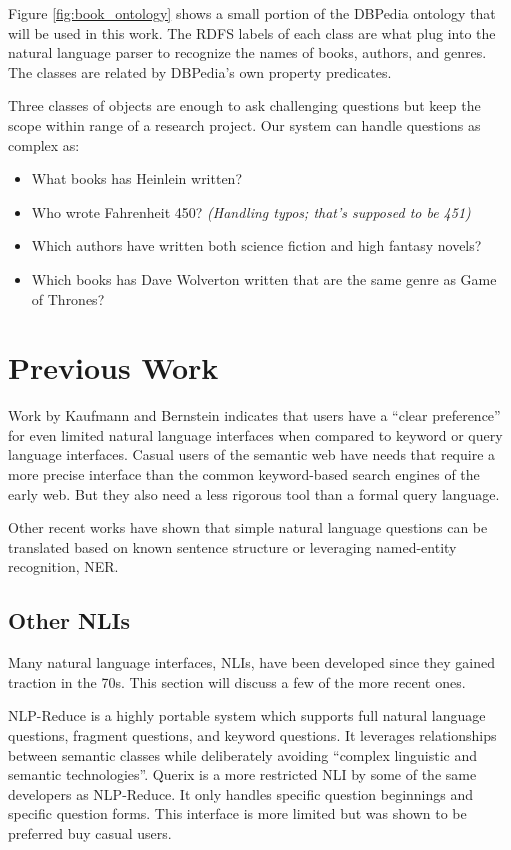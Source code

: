 \documentclass[11pt]{article}
\begin{document}
Figure \ref{fig:book_ontology} shows a small portion of the DBPedia ontology that
will be used in this work. The RDFS labels of each class are what plug into the
natural language parser to recognize the names of books, authors, and genres. 
The classes are related by DBPedia's own property predicates.

Three classes of objects are enough to ask challenging questions but keep the
scope within range of a research project. Our system can handle questions as complex as:
\begin{itemize}
\item What books has Heinlein written?
\item Who wrote Fahrenheit 450? {\em (Handling typos; that's supposed to be 451)}
\item Which authors have written both science fiction and high fantasy novels?
\item Which books has Dave Wolverton written that are the same genre as Game of Thrones?
\end{itemize}

\section{Previous Work}

Work by Kaufmann and Bernstein \cite{usability} indicates
that users have a ``clear preference'' for even limited natural language interfaces
when compared to keyword or query language interfaces.
Casual users of the semantic web have needs that require a more precise interface
than the common keyword-based search engines of the early web. But they also
need a less rigorous tool than a formal query language. \cite{usability}

Other recent works \cite{mapping, freya, galitsky, nlp-reduce, galitsky2, querix}
have shown that simple natural language questions can be translated based
on known sentence structure or leveraging named-entity recognition, NER.

\subsection{Other NLIs}
Many natural language interfaces, NLIs, have been developed since they gained traction
in the 70s\cite{usability}. This section will discuss a few of the more recent ones.

NLP-Reduce\cite{usability,nlp-reduce} is a highly portable system which supports full
natural language questions, fragment questions, and keyword questions.
It leverages relationships between semantic classes while deliberately avoiding
``complex linguistic and semantic technologies''\cite{nlp-reduce}.
Querix\cite{querix} is a more restricted NLI by some of the same developers as
NLP-Reduce. It only handles specific question beginnings and specific question forms. 
This interface is more limited but was shown to be preferred buy casual 
users\cite{usability}.
\end{document}
